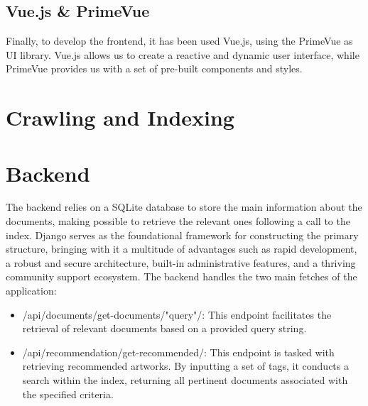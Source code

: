 \documentclass[12pt]{spieman}  %
\begin{document}
\begin{spacing}{1}
    \subsection{Vue.js \& PrimeVue}
    Finally, to develop the frontend, it has been used Vue.js, using the PrimeVue as UI library. Vue.js allows us to create a reactive and dynamic user interface, while PrimeVue provides us with a set of pre-built components and styles.

    \section{Crawling and Indexing}

    \section{Backend}
    The backend relies on a SQLite database to store the main information about the documents, making possible to retrieve the relevant ones following a call to the index.\newline
    Django serves as the foundational framework for constructing the primary structure, bringing with it a multitude of advantages such as rapid development, a robust and secure architecture, built-in administrative features, and a thriving community support ecosystem.\newline
    The backend handles the two main fetches of the application:
    \begin{itemize}
        \item /api/documents/get-documents/"query"/: This endpoint facilitates the retrieval of relevant documents based on a provided query string.
        \item /api/recommendation/get-recommended/: This endpoint is tasked with retrieving recommended artworks. By inputting a set of tags, it conducts a search within the index, returning all pertinent documents associated with the specified criteria.
    \end{itemize}

\end{spacing}
\end{document}
